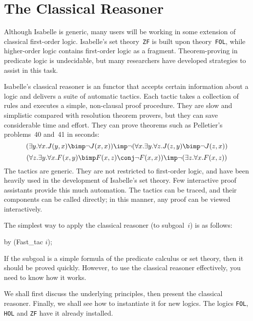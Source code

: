 \chapter{The Classical Reasoner}\label{chap:classical}
\newcommand\ainfer[2]{\begin{array}{r@{\,}l}#2\\ \hline#1\end{array}}

Although Isabelle is generic, many users will be working in some extension
of classical first-order logic.  Isabelle's set theory~{\tt ZF} is built
upon theory~{\tt FOL}, while higher-order logic contains first-order logic
as a fragment.  Theorem-proving in predicate logic is undecidable, but many
researchers have developed strategies to assist in this task.

Isabelle's classical reasoner is an \ML{} functor that accepts certain
information about a logic and delivers a suite of automatic tactics.  Each
tactic takes a collection of rules and executes a simple, non-clausal proof
procedure.  They are slow and simplistic compared with resolution theorem
provers, but they can save considerable time and effort.  They can prove
theorems such as Pelletier's~\cite{pelletier86} problems~40 and~41 in
seconds:
\[ (\exists y. \forall x. J(y,x) \bimp \neg J(x,x))  
   \imp  \neg (\forall x. \exists y. \forall z. J(z,y) \bimp \neg J(z,x)) \]
\[ (\forall z. \exists y. \forall x. F(x,y) \bimp F(x,z) \conj \neg F(x,x))
   \imp \neg (\exists z. \forall x. F(x,z))  
\]
%
The tactics are generic.  They are not restricted to first-order logic, and
have been heavily used in the development of Isabelle's set theory.  Few
interactive proof assistants provide this much automation.  The tactics can
be traced, and their components can be called directly; in this manner,
any proof can be viewed interactively.

The simplest way to apply the classical reasoner (to subgoal~$i$) is as
follows:
\begin{ttbox}
by (Fast_tac \(i\));
\end{ttbox}
If the subgoal is a simple formula of the predicate calculus or set theory,
then it should be proved quickly.  However, to use the classical reasoner
effectively, you need to know how it works.

We shall first discuss the underlying principles, then present the classical
reasoner.  Finally, we shall see how to instantiate it for new logics.  The
logics {\tt FOL}, {\tt HOL} and {\tt ZF} have it already installed.


